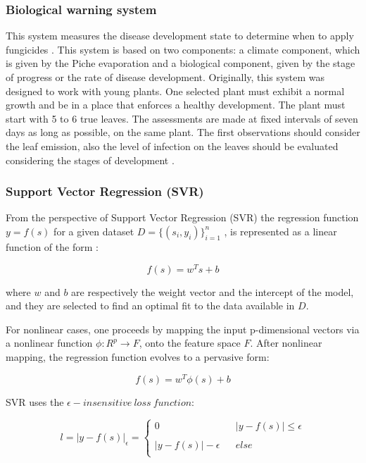 \documentclass[review]{elsarticle}
\begin{document}
\subsubsection{Biological warning system}

This system measures the disease development state to determine when to
apply fungicides \citep{MarinVargas1995}.  This system is based on two
components: a climate component, which is given by the Piche
evaporation and a biological component, given by the stage of progress
or the rate of disease development. Originally, this system was
designed to work with young plants. One selected plant must exhibit a
normal growth and be in a place that enforces a healthy
development. The plant must start with 5 to 6 true leaves. The
assessments are made at fixed intervals of seven days as long as
possible, on the same plant. The first observations should consider
the leaf emission, also the level of infection on the leaves should be
evaluated considering the stages of development
\citep{MarinVargas1995}.

\subsubsection{Support Vector Regression (SVR)}
From the perspective of Support Vector Regression (SVR) the regression function $y = f(s)$ for a given dataset $D=\{(s_i,y_i)\}_{i=1}^n$ , is represented as a linear function of the form \citep{Wei2013}:

$$f(s)=w^Ts+b$$

where $w$ and $b$ are respectively the weight vector and the intercept of the model, and they are selected to find an optimal fit to the data available in $D$.

For nonlinear cases, one proceeds by mapping the input p-dimensional vectors via a nonlinear function $\phi : R^p\rightarrow F$, onto the feature space $F$.  After nonlinear mapping, the regression function evolves to a pervasive form:

$$f(s)=w^T \phi (s)+b$$

SVR uses the $ \epsilon -insensitive \ loss \ function$:

\[l= {\Bigr| y - f(s) \Bigr| }_{\epsilon } = 
\left\{\begin{array}{lcl}
	0 & \mbox{} & {\Bigr| y - f(s) \Bigr| } \leq \epsilon \\
	 &  & \\
	{\Bigr| y - f(s) \Bigr| - \epsilon} & \mbox{} & else\\ \end{array} \right. \] 
\end{document}
